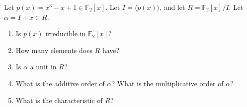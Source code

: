 \documentclass[12pt,letterpaper,boxed]{hmcpset}
\begin{document}
\begin{solution}
\end{solution}

\clearpage

\begin{problem}[19.3.5]
Let $p(x) = x^3 - x + 1 \in \mathbb{F}_2[x]$. Let $I = \langle p(x) \rangle$, and let $R = \mathbb{F}_2[x]/I$. Let $\alpha = I + x \in R$.
\begin{enumerate}[label=\alph*]
\item Is $p(x)$ irreducible in $\mathbb{F}_2[x]$?
\item How many elements does $R$ have?
\item Is $\alpha$ a unit in $R$?
\item What is the additive order of $\alpha$? What is the multiplicative order of $\alpha$?
\item What is the characteristic of $R$?
\end{enumerate}
\end{problem}

\begin{solution}
\end{solution}
\end{document}
